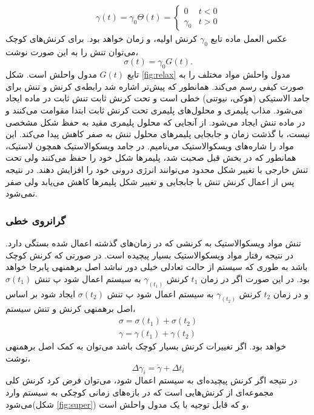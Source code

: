 \begin{equation}
\begin{aligned}
\gamma(t)=\gamma_0\Theta(t)=
  \begin{cases}
    0       & t<0\\
    \gamma_0  & t>0
  \end{cases}
\end{aligned}\label{eq:step_stress}
\end{equation}
عکس العمل ماده تابع $\gamma_0$ کرنش اولیه، و زمان خواهد بود. برای کرنش‌های کوچک می‌توان تنش را به این صورت نوشت،
\begin{equation}
\sigma(t)=\gamma_0G(t).
\end{equation}
تابع $G(t)$ مدول واحلش است. شکل \ref{fig:relax} مدول واحلش مواد مختلف را به صورت کیفی رسم می‌کند. همانطور که پیش‌تر اشاره شد رابطه‌ی کرنش و تنش برای جامد الاستیکی (هوکی، نیوتنی) خطی است و تحت کرنش ثابت تنش ثابت در ماده ایجاد می‌شود. مذاب پلیمری و محلول‌های پلیمری تحت کرنش ثابت ابتدا مقوامت می‌کنند و در ماده تنش ایجاد می‌شود. از آنجایی که محلول پلیمری مقید به حفظ شکل مشخصی نیست، با گذشت زمان و جابجایی پلیمر‌های محلول تنش به صفر کاهش پیدا می‌کند. این مواد را شاره‌های ویسکوالاستیک می‌نامیم. در جامد ویسکوالاستیک همچون لاستیک، همانطور که در بخش قبل صحبت شد، پلیمرها شکل‌ خود را حفظ می‌کنند ولی تحت تنش خارجی با تغییر شکل محدود می‌توانند انرژی درونی خود را افزایش دهند. در نتیجه پس از اعمال کرنش تنش با جابجایی و تغییر شکل پلیمر‌ها کاهش می‌یابد ولی صفر نمی‌شود.
\subsubsection{گرانروی خطی}

تنش مواد ویسکوالاستیک به کرنشی که در زمان‌های گذشته اعمال شده بستگی دارد. در نتیجه رفتار مواد ویسکوالاستیک بسیار پیچیده است. در صورتی که کرنش کوچک باشد به طوری که سیستم از حالت تعادلی خیلی دور نباشد اصل برهمنهی پابرجا خواهد بود\cite{doi}. در این صورت اگر در زمان $t_1$ کرنش $\gamma_(t_1)$ به سیستم اعمال شود پ تنش $\sigma(t_1)$ و در  زمان $t_2$ کرنش $\gamma_(t_2)$ به سیستم اعمال شود پ تنش $\sigma(t_2)$ ایجاد شود بر اساس اصل برهمنهی کرنش و تنش سیستم،
\begin{equation}
\begin{aligned}
\sigma=\sigma(t_1)+\sigma(t_2) \\
\gamma=\gamma(t_1)+\gamma(t_2)
\end{aligned}
\end{equation}
خواهد بود. اگر تغییرات کرنش بسیار کوچک باشد می‌توان به کمک اصل برهمنهی نوشت،
\begin{equation}
\Delta\gamma_i=\dot\gamma+\Delta t_i
\end{equation}
در نتیجه اگر کرنش پیچیده‌ای به سیستم اعمال شود، می‌توان فرض کرد کرنش کلی مجموعه‌ای از کرنش‌هایی است که در بازه‌های زمانی کوچکی به سیستم وارد می‌شود(شکل \ref{fig:super}) و که قابل توجیه با یک مدول واحلش است، 

